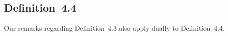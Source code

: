 \subsection{Definition~4.4}

Our remarks regarding Definition~4.3 also apply dually to Definition~4.4.
